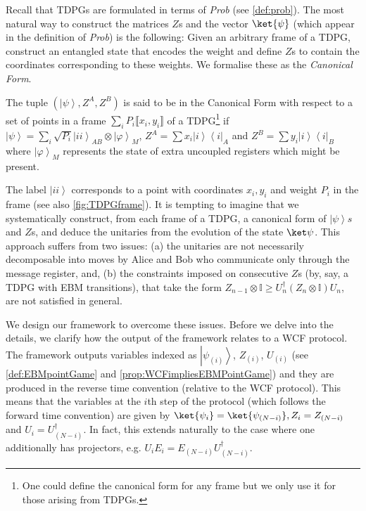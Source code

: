 \documentclass{theoretics}
\newcommand{\atul}[1]{#1} %
\begin{document}
Recall that TDPGs are formulated in terms of \emph{Prob} (see \cref{def:prob}). The most natural way to construct the matrices $Z$s and the vector $\ket{\psi}$ (which appear in the definition of \emph{Prob}) is the following: Given an arbitrary frame of a TDPG, construct an entangled state that encodes the weight and define $Z$s to contain the coordinates corresponding to these weights. %
We formalise these as the \emph{Canonical Form}.
%

%
%
%
%
%

\begin{definition}
  The tuple $(\left|\psi\right\rangle ,Z^{A},Z^{B})$ is said to be
  in the Canonical Form with respect to a set of points in a frame \atul{$\sum_i P_i \llbracket x_i,y_i \rrbracket$} of
  a TDPG\footnote{One could define the canonical form for any frame but we only use it for those arising from TDPGs.} if  $\left|\psi\right\rangle =\sum_{i}\sqrt{P_{i}}\left|ii\right\rangle _{AB}\otimes\left|\varphi\right\rangle _{M}$,
  $Z^{A}=\sum x_{i}\left|i\right\rangle \left\langle i\right|_{A}$
  and $Z^{B}=\sum y_{i}\left|i\right\rangle \left\langle i\right|_{B}$
  where $\left|\varphi\right\rangle _{M}$ represents the state of extra
  uncoupled registers which might be present.\label{def:canonicalform}
\end{definition}

The label $\left|ii\right\rangle$
corresponds to a point with coordinates $x_{i},y_{i}$ and weight $P_{i}$
in the frame (see also  \cref{fig:TDPGframe}). It is tempting to imagine that
we systematically construct, from each frame of a TDPG, a canonical
form of $\left|\psi\right\rangle s$ and $Z$s, and deduce the unitaries from the evolution of the state $\ket \psi$. This approach suffers from two issues: (a) the unitaries are not necessarily decomposable into moves by Alice and Bob who communicate only through the message register, and, (b) the constraints imposed on consecutive $Z$s (by, say, a TDPG with EBM transitions), that take the form $Z_{n-1}\otimes\mathbb{I}\ge U_{n}^{\dagger}\left(Z_{n}\otimes\mathbb{I}\right)U_{n}$, are not satisfied in general.

We design our framework to overcome these issues. Before we delve into the details, we clarify how the output of the framework relates to a WCF protocol. The framework outputs variables indexed as $\left|\psi_{(i)}\right\rangle $, $Z_{(i)}$,
$U_{(i)}$ (see \cref{def:EBMpointGame} and \cref{prop:WCFimpliesEBMPointGame}) and they are produced in the reverse time convention (relative to the WCF protocol). This means that the variables at the $i$th step of the protocol (which follows the forward time convention) are given by $\ket{\psi_{i}}=\ket{\psi_{(N-i)}}, Z_i=Z_{(N-i)}$ and $U_{i}=U^\dagger_{(N-i)}$. In fact, this extends naturally to the case where one additionally has projectors, e.g. $U_{i}E_{i}=E_{(N-i)}U_{(N-i)}^{\dagger}$.
\end{document}
